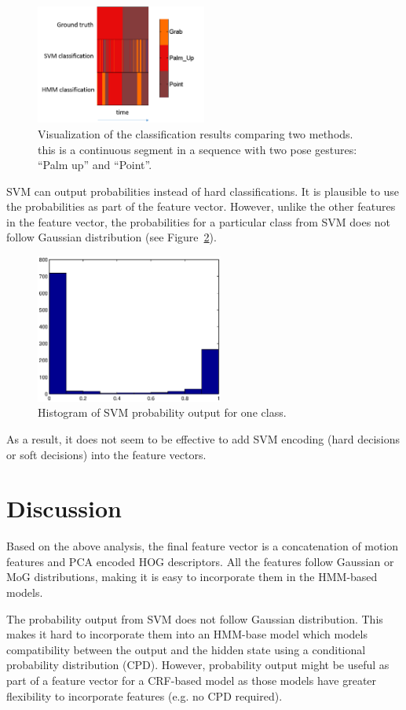 \begin{figure}[tbh]
\centering
\includegraphics[width=0.5\textwidth]{figures/svm_hmm.png}
\caption{Visualization of the classification results comparing two methods.
this is a continuous segment in a sequence with two pose gestures: ``Palm up''
and ``Point''.}
\label{fig:svm-hmm}
\end{figure}

SVM can output probabilities instead of hard classifications. It is plausible to
use the probabilities as part of the feature vector. However, unlike the other
features in the feature vector, the probabilities for a particular class from
SVM does not follow Gaussian distribution (see Figure~\ref{fig:svm}). 

\begin{figure}[tbh]
\centering
\includegraphics[width=0.55\textwidth]{figures/hist_svm.eps}
\caption{Histogram of SVM probability output for one class.}
\label{fig:svm}
\end{figure}

As a result, it does not seem to be
effective to add SVM encoding (hard decisions or soft decisions) into the
feature vectors.

\section{Discussion}
Based on the above analysis, the final feature vector is a concatenation of
motion features and PCA encoded HOG descriptors. All the features follow
Gaussian or MoG distributions, making it is easy to incorporate them in the
HMM-based models.

The probability output from SVM does not follow Gaussian distribution. This
makes it hard to incorporate them into an HMM-base model which models
compatibility between the output and the hidden state using a conditional probability
distribution (CPD). However, probability output might be useful as part of a
feature vector for a CRF-based model as those models have greater flexibility to
incorporate features (e.g. no CPD required). 
